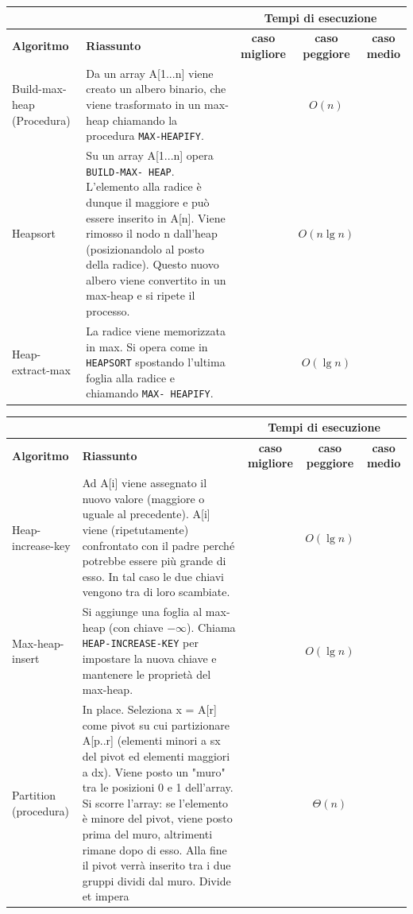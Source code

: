 \documentclass[11pt,a4paper]{article}
\begin{document}
\begin{sideways}
  \begin{tabularx}{550pt}{l|X|c|c|c}
    \multicolumn{2}{c}{\ } & \multicolumn{3}{c}{\textbf{Tempi di esecuzione}}\\
    \hline
    \textbf{Algoritmo} & \textbf{Riassunto} & \textbf{caso migliore} & \textbf{caso peggiore} & \textbf{caso medio}\\
    \hline
    Build-max-heap (Procedura) &
    Da un array A[1...n] viene creato un albero
    binario, che viene trasformato in un max-heap
    chiamando la procedura \texttt{MAX-HEAPIFY}. & &
    $O(n)$\\
    \hline
    Heapsort &
    Su un array A[1...n] opera \texttt{BUILD-MAX-
    HEAP}. L’elemento alla radice è dunque il
    maggiore e può essere inserito in A[n]. Viene
    rimosso il nodo n dall’heap (posizionandolo al
    posto della radice). Questo nuovo albero
    viene convertito in un max-heap e si ripete il
    processo. & &
    $O(n \lg n)$ \\
    \hline
    Heap-extract-max &
    La radice viene memorizzata in max.
    Si opera come in \texttt{HEAPSORT} spostando
    l’ultima foglia alla radice e chiamando \texttt{MAX-
    HEAPIFY}. & &
    $O(\lg n)$
  \end{tabularx}
\end{sideways}

\begin{sideways}
  \begin{tabularx}{550pt}{l|X|c|c|c}
    \multicolumn{2}{c}{\ } & \multicolumn{3}{c}{\textbf{Tempi di esecuzione}}\\
    \hline
    \textbf{Algoritmo} & \textbf{Riassunto} & \textbf{caso migliore} & \textbf{caso peggiore} & \textbf{caso medio}\\
    \hline
    Heap-increase-key &
    Ad A[i] viene assegnato il nuovo valore
    (maggiore o uguale al precedente). A[i] viene
    (ripetutamente) confrontato con il padre
    perché potrebbe essere più grande di esso. In
    tal caso le due chiavi vengono tra di loro
    scambiate. & &
    $O(\lg n)$ \\
    \hline
    Max-heap-insert &
    Si aggiunge una foglia al max-heap (con
    chiave $-\infty$). Chiama \texttt{HEAP-INCREASE-KEY}
    per impostare la nuova chiave e mantenere le
    proprietà del max-heap. & &
    $O(\lg n)$ \\
    \hline
    Partition
    (procedura) &
    In place. Seleziona x = A[r] come pivot su cui
    partizionare A[p..r] (elementi minori a sx del
    pivot ed elementi maggiori a dx).
    Viene posto un "muro" tra le posizioni 0 e 1
    dell’array. Si scorre l’array: se l’elemento è
    minore del pivot, viene posto prima del
    muro, altrimenti rimane dopo di esso. Alla
    fine il pivot verrà inserito tra i due gruppi
    dividi dal muro.
    Divide et impera & &
    $\Theta(n)$
  \end{tabularx}
\end{sideways}
\end{document}

